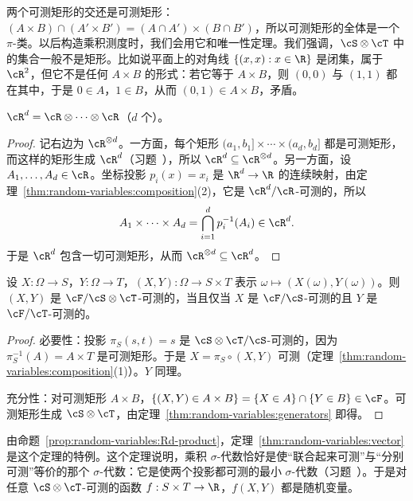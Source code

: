 两个可测矩形的交还是可测矩形：$(A\times B)\cap(A'\times B')=(A\cap A')\times(B\cap B')$，所以可测矩形的全体是一个 $\pi$-类。以后构造乘积测度时，我们会用它和唯一性定理。我们强调，$\cS\otimes\cT$ 中的集合一般不是矩形。比如说平面上的对角线 $\{(x,x):x\in\R\}$ 是闭集，属于 $\cR^2$，但它不是任何 $A\times B$ 的形式：若它等于 $A\times B$，则 $(0,0)$ 与 $(1,1)$ 都在其中，于是 $0\in A$，$1\in B$，从而 $(0,1)\in A\times B$，矛盾。

\begin{proposition}\label{prop:random-variables:Rd-product}
$\cR^d=\cR\otimes\cdots\otimes\cR$（$d$ 个）。
\end{proposition}
\begin{proof}
记右边为 $\cR^{\otimes d}$。一方面，每个矩形 $(a_1,b_1]\times\cdots\times(a_d,b_d]$ 都是可测矩形，而这样的矩形生成 $\cR^d$（习题~），所以 $\cR^d\subseteq\cR^{\otimes d}$。另一方面，设 $A_1,\dots,A_d\in\cR$。坐标投影 $p_i(x)=x_i$ 是 $\R^d\to\R$ 的连续映射，由定理~\ref{thm:random-variables:composition}(2)，它是 $\cR^d/\cR$-可测的，所以
\[
A_1\times\cdots\times A_d=\bigcap_{i=1}^dp_i^{-1}(A_i)\in\cR^d .
\]
于是 $\cR^d$ 包含一切可测矩形，从而 $\cR^{\otimes d}\subseteq\cR^d$。
\end{proof}

\begin{theorem}[取值于乘积空间的映射]\label{thm:random-variables:product-map}
设 $X:\Omega\to S$，$Y:\Omega\to T$，$(X,Y):\Omega\to S\times T$ 表示 $\omega\mapsto(X(\omega),Y(\omega))$。则 $(X,Y)$ 是 $\cF/\cS\otimes\cT$-可测的，当且仅当 $X$ 是 $\cF/\cS$-可测的且 $Y$ 是 $\cF/\cT$-可测的。
\end{theorem}
\begin{proof}
必要性：投影 $\pi_S(s,t)=s$ 是 $\cS\otimes\cT/\cS$-可测的，因为 $\pi_S^{-1}(A)=A\times T$ 是可测矩形。于是 $X=\pi_S\circ(X,Y)$ 可测（定理~\ref{thm:random-variables:composition}(1)）。$Y$ 同理。

充分性：对可测矩形 $A\times B$，$\{(X,Y)\in A\times B\}=\{X\in A\}\cap\{Y\in B\}\in\cF$。可测矩形生成 $\cS\otimes\cT$，由定理~\ref{thm:random-variables:generators} 即得。
\end{proof}

由命题~\ref{prop:random-variables:Rd-product}，定理~\ref{thm:random-variables:vector} 是这个定理的特例。这个定理说明，乘积 $\sigma$-代数恰好是使“联合起来可测”与“分别可测”等价的那个 $\sigma$-代数：它是使两个投影都可测的最小 $\sigma$-代数（习题~）。于是对任意 $\cS\otimes\cT$-可测的函数 $f:S\times T\to\R$，$f(X,Y)$ 都是随机变量。

